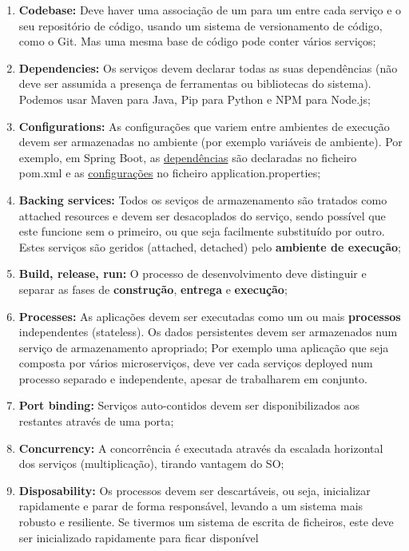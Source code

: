 \documentclass{article}
\begin{document}
\begin{enumerate}
  \item \textbf{Codebase:} Deve haver uma associação de um para um entre cada serviço e o seu repositório de código,
  usando um sistema de versionamento de código, como o Git. Mas uma mesma base de código pode conter vários serviços;
  \item \textbf{Dependencies:} Os serviços devem declarar todas as suas dependências (não deve ser assumida a presença de
  ferramentas ou bibliotecas do sistema). Podemos usar Maven para Java, Pip para Python e NPM para Node.js;
  \item \textbf{Configurations:} As configurações que variem entre ambientes de execução devem ser armazenadas no ambiente (por
  exemplo variáveis de ambiente). Por exemplo, em Spring Boot, as \uline{dependências} são declaradas no ficheiro pom.xml e as
  \uline{configurações} no ficheiro application.properties;
  \item \textbf{Backing services:} Todos os seviços de armazenamento são tratados como attached resources e devem ser desacoplados do serviço, sendo possível que
  este funcione sem o primeiro, ou que seja facilmente substituído por outro. Estes serviços
  são geridos (attached, detached) pelo \textbf{ambiente de execução};
  \item \textbf{Build, release, run:} O processo de desenvolvimento deve distinguir e separar as fases de \textbf{construção}, \textbf{entrega} e \textbf{execução};
  \item \textbf{Processes:} As aplicações devem ser executadas como um ou mais \textbf{processos} independentes (stateless).
  Os dados persistentes devem ser armazenados num serviço de armazenamento apropriado;
  Por exemplo uma aplicação que seja composta por vários microserviços, deve ver cada serviços deployed
  num processo separado e independente, apesar de trabalharem em conjunto.
  \item \textbf{Port binding:} Serviços auto-contidos devem ser disponibilizados aos restantes através de uma porta;
  \item \textbf{Concurrency:} A concorrência é executada através da escalada horizontal dos serviços (multiplicação), tirando vantagem
  do SO;
  \item \textbf{Disposability:} Os processos devem ser descartáveis, ou seja, inicializar rapidamente e parar de forma
  responsável, levando a um sistema mais robusto e resiliente. Se tivermos um sistema de escrita de ficheiros, este deve ser inicializado rapidamente para ficar disponível

\end{enumerate}
\end{document}
